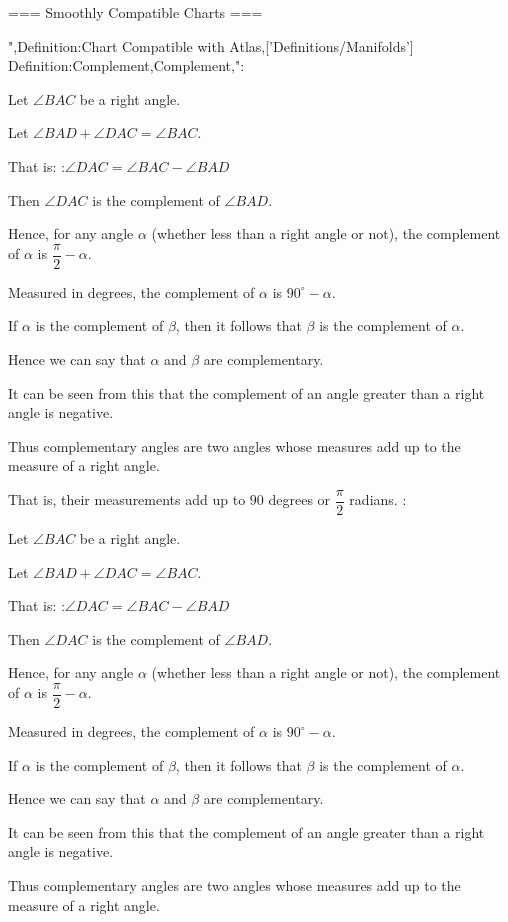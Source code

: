 === Smoothly Compatible Charts ===

",Definition:Chart Compatible with Atlas,['Definitions/Manifolds']
Definition:Complement,Complement,":

Let $\angle BAC$ be a right angle.

Let $\angle BAD + \angle DAC = \angle BAC$.

That is:
:$\angle DAC = \angle BAC - \angle BAD$


Then $\angle DAC$ is the complement of $\angle BAD$.


Hence, for any angle $\alpha$ (whether less than a right angle or not), the complement of $\alpha$ is $\dfrac \pi 2 - \alpha$.

Measured in degrees, the complement of $\alpha$ is $90^\circ - \alpha$.


If $\alpha$ is the complement of $\beta$, then it follows that $\beta$ is the complement of $\alpha$.

Hence we can say that $\alpha$ and $\beta$ are complementary.


It can be seen from this that the complement of an angle greater than a right angle is negative.


Thus complementary angles are two angles whose measures add up to the measure of a right angle.

That is, their measurements add up to $90$ degrees or $\dfrac \pi 2$ radians.
:

Let $\angle BAC$ be a right angle.

Let $\angle BAD + \angle DAC = \angle BAC$.

That is:
:$\angle DAC = \angle BAC - \angle BAD$


Then $\angle DAC$ is the complement of $\angle BAD$.


Hence, for any angle $\alpha$ (whether less than a right angle or not), the complement of $\alpha$ is $\dfrac \pi 2 - \alpha$.

Measured in degrees, the complement of $\alpha$ is $90^\circ - \alpha$.


If $\alpha$ is the complement of $\beta$, then it follows that $\beta$ is the complement of $\alpha$.

Hence we can say that $\alpha$ and $\beta$ are complementary.


It can be seen from this that the complement of an angle greater than a right angle is negative.


Thus complementary angles are two angles whose measures add up to the measure of a right angle.

